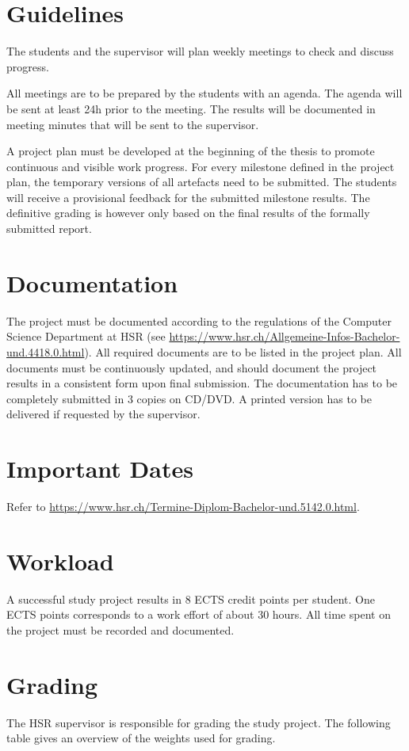 \documentclass[a4paper]{article}
\begin{document}
\section{Guidelines}

The students and the supervisor will plan weekly meetings to check and discuss progress.

All meetings are to be prepared by the students with an agenda. The agenda will be sent at least 24h prior to the meeting. The results will be documented in meeting minutes that will be sent to the supervisor.

A project plan must be developed at the beginning of the thesis to promote continuous and visible work progress. For every milestone defined in the project plan, the temporary versions of all artefacts need to be submitted. The students will receive a provisional feedback for the submitted milestone results. The definitive grading is however only based on the final results of the formally submitted report.

\section{Documentation}
The project must be documented according to the regulations of the Computer Science Department at HSR (see \url{https://www.hsr.ch/Allgemeine-Infos-Bachelor-und.4418.0.html}). All required documents are to be listed in the project plan. All documents must be continuously updated, and should document the project results in a consistent form upon final submission. The documentation has to be completely submitted in 3 copies on CD/DVD. A printed version has to be delivered if requested by the supervisor.

\section{Important Dates}
Refer to \url{https://www.hsr.ch/Termine-Diplom-Bachelor-und.5142.0.html}.

\section{Workload}
A successful study project results in 8 ECTS credit points per student. One ECTS points corresponds to a work effort of about 30 hours. All time spent on the project must be recorded and documented.

\section{Grading}
The HSR supervisor is responsible for grading the study project. The following table gives an overview of the weights used for grading.
\end{document}
